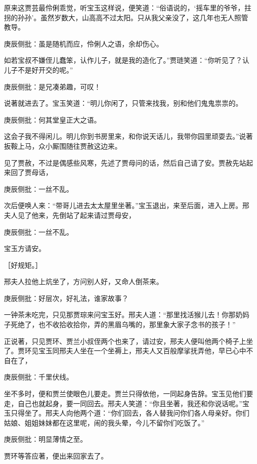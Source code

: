\begin{parag}
    原来这贾芸最伶俐乖觉，听宝玉这样说，便笑道：“俗语说的，‘摇车里的爷爷，拄拐的孙孙’。虽然岁数大，山高高不过太阳。只从我父亲没了，这几年也无人照管教导。\begin{note}庚辰侧批：虽是随机而应，伶俐人之语，余却伤心。\end{note}如若宝叔不嫌侄儿蠢笨，认作儿子，就是我的造化了。”贾琏笑道：“你听见了？认儿子不是好开交的呢。”\begin{note}庚辰侧批：是兄凑弟趣，可叹！\end{note}说著就进去了。宝玉笑道：“明儿你闲了，只管来找我，别和他们鬼鬼祟祟的。\begin{note}庚辰侧批：何其堂皇正大之语。\end{note}这会子我不得闲儿。明儿你到书房里来，和你说天话儿，我带你园里顽耍去。”说著扳鞍上马，众小厮围随往贾赦这边来。
\end{parag}


\begin{parag}
    见了贾赦，不过是偶感些风寒，先述了贾母问的话，然后自己请了安。贾赦先站起来回了贾母话，\begin{note}庚辰侧批：一丝不乱。\end{note}次后便唤人来：“带哥儿进去太太屋里坐著。”宝玉退出，来至后面，进入上房。邢夫人见了他来，先倒站了起来请过贾母安，\begin{note}庚辰侧批：一丝不乱。\end{note}宝玉方请安。\begin{note}［好规矩。］\end{note}邢夫人拉他上炕坐了，方问别人好，又命人倒茶来。\begin{note}庚辰侧批：好层次，好礼法，谁家故事？\end{note}一钟茶未吃完，只见那贾琮来问宝玉好。邢夫人道：“那里找活猴儿去！你那奶妈子死绝了，也不收拾收拾你，弄的黑眉乌嘴的，那里象大家子念书的孩子！”
\end{parag}


\begin{parag}
    正说著，只见贾环、贾兰小叔侄两个也来了，请过安，邢夫人便叫他两个椅子上坐了。贾环见宝玉同邢夫人坐在一个坐褥上，邢夫人又百般摩挲抚弄他，早已心中不自在了，\begin{note}庚辰侧批：千里伏线。\end{note}坐不多时，便和贾兰使眼色儿要走。贾兰只得依他，一同起身告辞。宝玉见他们要走，自己也就起身，要一同回去。邢夫人笑道：“你且坐著，我还和你说话呢。”宝玉只得坐了。邢夫人向他两个道：“你们回去，各人替我问你们各人母亲好。你们姑娘、姐姐妹妹都在这里呢，闹的我头晕，今儿不留你们吃饭了。”\begin{note}庚辰侧批：明显薄情之至。\end{note}贾环等答应著，便出来回家去了。
\end{parag}


